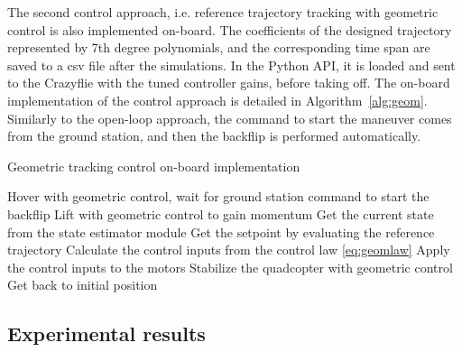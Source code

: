 The second control approach, i.e. reference trajectory tracking with geometric control is also implemented on-board. The coefficients of the designed trajectory represented by 7th degree polynomials, and the corresponding time span are saved to a csv file after the simulations. In the Python API, it is loaded and sent to the Crazyflie with the tuned controller gains, before taking off. The on-board implementation of the control approach is detailed in Algorithm~\ref{alg:geom}. Similarly to the open-loop approach, the command to start the maneuver comes from the ground station, and then the backflip is performed automatically.
\begin{algorithm}
  \caption{Geometric tracking control on-board implementation}
  \label{alg:geom}
  \begin{algorithmic}[1]
    \State Hover with geometric control, wait for ground station command to start the backflip
    \State Lift with geometric control to gain momentum
      \State Get the current state from the state estimator module
      \State Get the setpoint by evaluating the reference trajectory
      \State Calculate the control inputs from the control law \eqref{eq:geomlaw}
      \State Apply the control inputs to the motors
    \EndWhile
    \State Stabilize the quadcopter with geometric control
    \State Get back to initial position
  \end{algorithmic}
  \end{algorithm}




\subsection{Experimental results}

